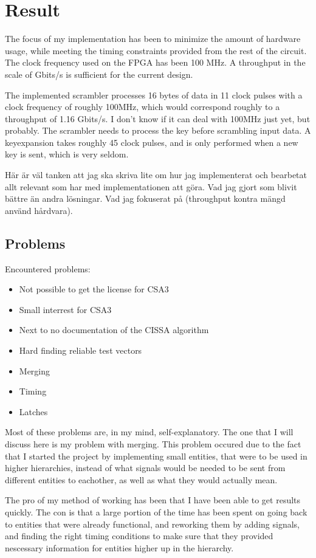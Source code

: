\chapter{Result}
The focus of my implementation has been to minimize the amount of hardware usage,
while meeting the timing constraints provided from the rest of the circuit. The 
clock frequency used on the FPGA has been 100 MHz. A throughput in the scale of 
Gbits/s is sufficient for the current design.

The implemented scrambler processes 16 bytes of data in 11 clock pulses with a 
clock frequency of roughly 100MHz, which would correspond roughly to a throughput
of 1.16 Gbits/s. I don't know if it can deal with 100MHz just yet, but probably. 
The scrambler needs to process the key before scrambling input data. A 
keyexpansion takes roughly 45 clock pulses, and is only performed when a new key 
is sent, which is very seldom.

Här är väl tanken att jag ska skriva lite om hur jag implementerat
och bearbetat allt relevant som har med implementationen att göra. 
Vad jag gjort som blivit bättre än andra lösningar. Vad jag fokuserat
på (throughput kontra mängd använd hårdvara).

\section{Problems}
Encountered problems:

\begin{itemize}
\item Not possible to get the license for CSA3
\item Small interrest for CSA3
\item Next to no documentation of the CISSA algorithm
\item Hard finding reliable test vectors
\item Merging
\item Timing
\item Latches
\end{itemize}

Most of these problems are, in my mind, self-explanatory. The one that 
I will discuss here is my problem with merging. This problem occured 
due to the fact that I started the project by implementing small 
entities, that were to be used in higher hierarchies, instead of what 
signals would be needed to be sent from different entities to 
eachother, as well as what they would actually mean.

The pro of my method of working has been that I have been able to get 
results quickly. The con is that a large portion of the time has been 
spent on going back to entities that were already functional, and 
reworking them by adding signals, and finding the right timing 
conditions to make sure that they provided nescessary information for 
entities higher up in the hierarchy.

